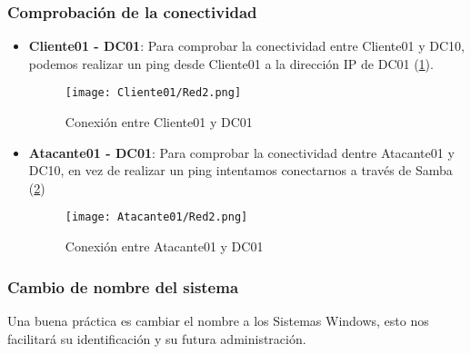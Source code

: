 \subsubsection{Comprobación de la conectividad}

\begin{itemize}

\item \textbf{Cliente01 - DC01}: Para comprobar la conectividad entre Cliente01 y DC10, podemos realizar un ping desde Cliente01 a la dirección IP de DC01 (\ref{Cliente01-Red2}).
\begin{figure}[H] %
\begin{center}
\texttt{[image: Cliente01/Red2.png]}
\end{center}
\caption{Conexión entre Cliente01 y DC01}
\label{Cliente01-Red2}
\end{figure}

\item \textbf{Atacante01 - DC01}: Para comprobar la conectividad dentre Atacante01 y DC10, en vez de realizar un ping intentamos conectarnos a través de Samba (\ref{Atacante01-Red2})
\begin{figure}[H] %
\begin{center}
\texttt{[image: Atacante01/Red2.png]}
\end{center}
\caption{Conexión entre Atacante01 y DC01}
\label{Atacante01-Red2}
\end{figure}

\end{itemize}

\subsubsection{Cambio de nombre del sistema}

Una buena práctica es cambiar el nombre a los Sistemas Windows, esto nos facilitará su identificación y su futura administración. 

